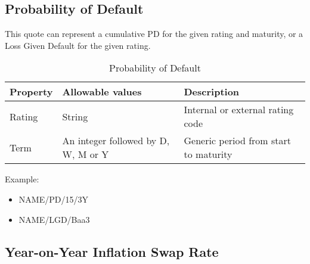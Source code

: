 %
%
%

\subsection{Probability of Default}\label{ss:prob_default_quote}

This quote can represent a cumulative PD for the given rating and maturity, or a Loss Given Default for the given rating.

\begin{table}[H]
\centering
\begin{tabular}{|p{3cm}|p{3.5cm}|p{7cm}|}
\hline
{\bf Property} & {\bf Allowable values} & {\bf Description} \\
\hline
Rating & String & Internal or external rating code \\ \hline
Term & An integer followed by D, W, M or Y & Generic period from start to maturity\\ 
\hline
\end{tabular}
  \caption{Probability of Default}
  \label{tab:pd_quote}
\end{table}

Example:
\begin{itemize}
\item {NAME/PD/15/3Y}
\item{NAME/LGD/Baa3}
\end{itemize}



\subsection{Year-on-Year Inflation Swap Rate} \label{ss:yoy_inflation_swap_rate}


